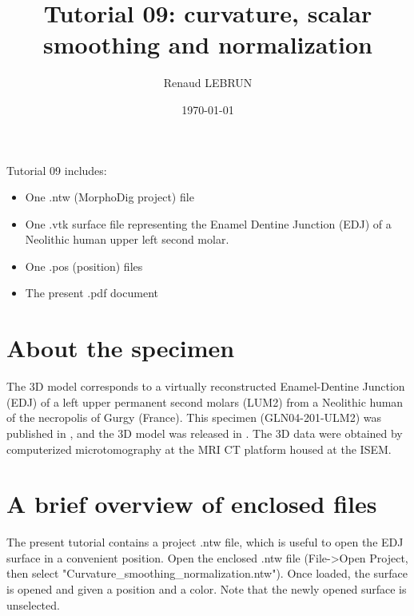 \documentclass[12pt, a4paper]{book}
\title{Tutorial 09: curvature, scalar smoothing and normalization}
\author{Renaud LEBRUN}
\affil{Institut des Sciences de l'Evolution, Université de Montpellier, France}
\date{\today}
\begin{document}
	\dominitoc

\maketitle


\faketableofcontents



\minitoc 
Tutorial 09 includes:
\begin{itemize}
\item One .ntw (MorphoDig project) file
\item One .vtk surface file representing the Enamel Dentine Junction (EDJ) of a Neolithic human upper left second molar.
\item One .pos (position) files 
\item The present .pdf document
\end{itemize}



\section{About the specimen}
The 3D model corresponds to a virtually reconstructed Enamel-Dentine Junction (EDJ) of a left upper permanent second molars (LUM2) from a Neolithic human of the necropolis of Gurgy (France). This specimen (GLN04-201-ULM2) was published in \citet{LeLuyer2016}, and the 3D model was released in \citet{LeLuyer2016a}.
The 3D data were obtained by computerized microtomography at the MRI \si{\micro}CT platform housed at the ISEM. 


\section{A brief overview of enclosed files}
		
The present tutorial contains a project .ntw file, which is useful to open the EDJ surface in a convenient position. Open the enclosed .ntw file (File->Open Project, then select "Curvature\_smoothing\_normalization.ntw"). Once loaded, the surface is opened and given a position and a color. Note that the newly opened surface is unselected.
\end{document}
